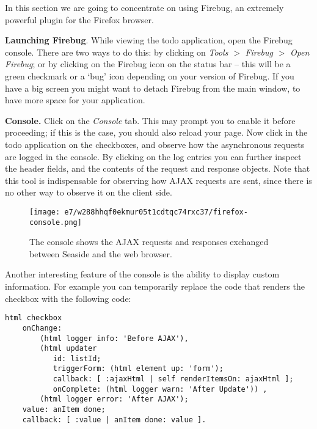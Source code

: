 \documentclass[a4paper,10pt,twoside]{book}
\begin{document}
In this section we are going to concentrate on using Firebug, an extremely powerful plugin for the Firefox browser.

\textbf{Launching Firebug}. While viewing the todo application, open the Firebug console. There are two ways to do this: by clicking on \textit{Tools} $>$ \textit{ Firebug} $>$ \textit{Open Firebug}; or by clicking on the Firebug icon on the status bar -- this will be a green checkmark or a `bug' icon depending on your version of Firebug. If you have a big screen you might want to detach Firebug from the main window, to have more space for your application.

\textbf{Console.} Click on the \textit{Console} tab. This may prompt you to enable it before proceeding; if this is the case, you should also reload your page. Now click in the todo application on the checkboxes, and observe how the asynchronous requests are logged in the console. By clicking on the log entries you can further inspect the header fields, and the contents of the request and response objects. Note that this tool is indispensable for observing how AJAX requests are sent, since there is no other way to observe it on the client side.

\begin{figure}[h!tbp]
	\begin{center}
		\texttt{[image: e7/w288hhqf0ekmur05t1cdtqc74rxc37/firefox-console.png]}
		\caption{The console shows the AJAX requests and responses exchanged between Seaside and the web browser.\label{book:web20:scriptaculous:debugging:firefoxconsole}}
	\end{center}
\end{figure}


Another interesting feature of the console is the ability to display custom information. For example you can temporarily replace the code that renders the checkbox with the following code:

\begin{lstlisting}
html checkbox
    onChange:
        (html logger info: 'Before AJAX'),
        (html updater
           id: listId;
           triggerForm: (html element up: 'form');
           callback: [ :ajaxHtml | self renderItemsOn: ajaxHtml ];
           onComplete: (html logger warn: 'After Update')) ,
        (html logger error: 'After AJAX');
    value: anItem done;
    callback: [ :value | anItem done: value ].
\end{lstlisting}
\end{document}
